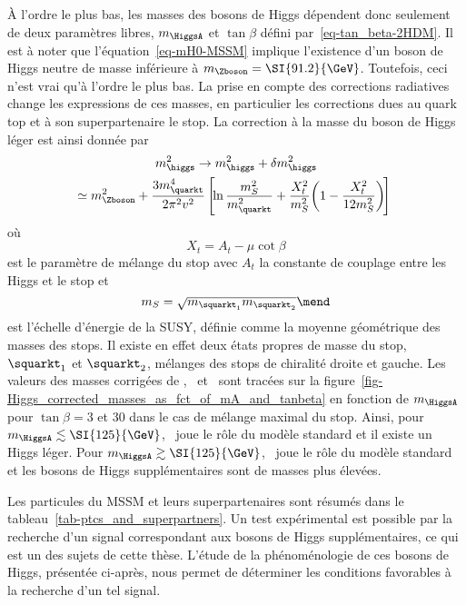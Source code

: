\par À l'ordre le plus bas, les masses des bosons de Higgs dépendent donc seulement de deux paramètres libres, $m_{\HiggsA}$ et $\tan\beta$ défini par~\eqref{eq-tan_beta-2HDM}.
Il est à noter que l'équation~\eqref{eq-mH0-MSSM} implique l'existence d'un boson de Higgs neutre de masse inférieure à $m_{\Zboson}=\SI{91.2}{\GeV}$.
Toutefois, ceci n'est vrai qu'à l'ordre le plus bas.
La prise en compte des corrections radiatives change les expressions de ces masses, en particulier les corrections dues au quark top et à son superpartenaire le stop.
La correction à la masse du boson de Higgs léger est ainsi donnée par~\cite{Nagashima_BSM}
\begin{gather}
m_{\higgs}^2 \to m_{\higgs}^2 + \delta m_{\higgs}^2
\nonumber\\
\! \! \simeq m_{\Zboson}^2
+ \frac{3 m_{\quarkt}^4}{2 \pi^2 v^2} \left[ \! \ln\frac{m_S^2}{m_{\quarkt}^2} + \frac{X_t^2}{m_S^2} \! \left(1-\frac{X_t^2}{12 m_S^2}\right) \! \right]
\end{gather}
où
\begin{equation}
X_t = A_t - \mu\cot\beta
\end{equation}
est le paramètre de mélange du stop avec $A_t$ la constante de couplage entre les Higgs et le stop
et
\begin{equation}
m_S = \sqrt{m_{\squarkt_1}m_{\squarkt_2}}
\mend
\end{equation}
est l'échelle d'énergie de la SUSY, définie comme la moyenne géométrique des masses des stops.
Il existe en effet deux états propres de masse du stop, $\squarkt_1$ et $\squarkt_2$, mélanges des stops de chiralité droite et gauche.
Les valeurs des masses corrigées de \higgs, \Higgs\ et \Higgspm\ sont tracées sur la figure~\ref{fig-Higgs_corrected_masses_as_fct_of_mA_and_tanbeta} en fonction de $m_{\HiggsA}$ pour $\tan\beta=3$ et $30$ dans le cas de mélange maximal du stop.
Ainsi, pour $m_{\HiggsA} \lesssim \SI{125}{\GeV}$, \Higgs\ joue le rôle du modèle standard et il existe un Higgs léger.
Pour $m_{\HiggsA} \gtrsim \SI{125}{\GeV}$, \higgs\ joue le rôle du modèle standard et les bosons de Higgs supplémentaires sont de masses plus élevées.
\par Les particules du MSSM et leurs superpartenaires sont résumés dans le tableau~\ref{tab-ptcs_and_superpartners}.
Un test expérimental est possible par la recherche d'un signal correspondant aux bosons de Higgs supplémentaires, ce qui est un des sujets de cette thèse.
L'étude de la phénoménologie de ces bosons de Higgs, présentée ci-après, nous permet de déterminer les conditions favorables à la recherche d'un tel signal.
